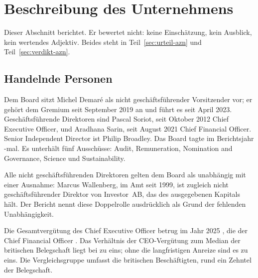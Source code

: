 \section{Beschreibung des Unternehmens}
\label{sec:unternehmen-azn}

Dieser Abschnitt berichtet. Er bewertet nicht: keine Einsch\"atzung, kein
Ausblick, kein wertendes Adjektiv. Beides steht in Teil~\ref{sec:urteil-azn}
und Teil~\ref{sec:verdikt-azn}.

\subsection{Handelnde Personen}

Dem Board sitzt Michel Demar\'e als nicht gesch\"aftsf\"uhrender Vorsitzender
vor; er geh\"ort dem Gremium seit September 2019 an und f\"uhrt es seit April
2023.
Gesch\"aftsf\"uhrende Direktoren sind Pascal Soriot, seit Oktober 2012 Chief
Executive Officer, und Aradhana Sarin, seit August 2021 Chief Financial
Officer.
Senior Independent Director ist Philip Broadley.
Das Board tagte im Berichtsjahr \Stueck{\AznBoardSitzungen}-mal.
Es unterh\"alt f\"unf Aussch\"usse: Audit, Remuneration, Nomination and
Governance, Science und Sustainability.

Alle nicht gesch\"aftsf\"uhrenden Direktoren gelten dem Board als unabh\"angig
mit einer Ausnahme: Marcus Wallenberg, im Amt seit 1999, ist zugleich
nicht gesch\"aftsf\"uhrender Direktor von Investor~AB, das \Pct{\AznInvestorAB}
des ausgegebenen Kapitals h\"alt.
Der Bericht nennt diese Doppelrolle ausdr\"ucklich als Grund der fehlenden
Unabh\"angigkeit.

Die Gesamtverg\"utung des Chief Executive Officer betrug im Jahr 2025
\MioGBP{\AznCeoVerguetungMio}, die der Chief Financial Officer
\MioGBP{\AznCfoVerguetungMio}.
Das Verh\"altnis der CEO-Verg\"utung zum Median der britischen Belegschaft
liegt bei \Stueck{\AznPayRatio} zu eins; ohne die langfristigen Anreize sind es
\Stueck{\AznPayRatioOhneLti} zu eins.
Die Vergleichsgruppe umfasst die britischen Besch\"aftigten, rund ein Zehntel
der Belegschaft.

